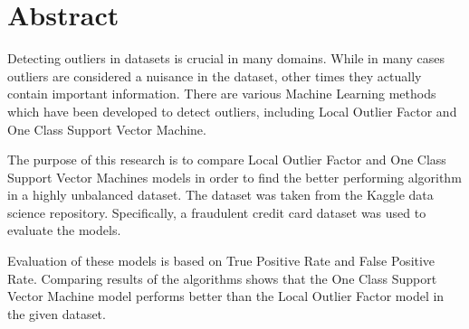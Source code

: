 \chapter*{Abstract}
Detecting outliers in datasets is crucial in many domains. While in many cases outliers are considered a nuisance in the dataset, other times they actually contain important information. There are various Machine Learning methods which have been developed to detect outliers, including Local Outlier Factor and One Class Support Vector Machine.

The purpose of this research is to compare Local Outlier Factor and One Class Support Vector Machines models in order to find the better performing algorithm in a highly unbalanced dataset. The dataset was taken from the Kaggle data science repository. Specifically, a fraudulent credit card dataset was used to evaluate the models.

Evaluation of these models is based on True Positive Rate and False Positive Rate. Comparing results of the algorithms shows that the One Class Support Vector Machine model performs better than the Local Outlier Factor model in the given dataset.
\begin{comment}
Detecting outliers in datasets is valuable in many domains. Identifying the unusual behavior in datasets provide information that is useful. There are various statistical methods used to detect outliers. However, they assume that the data has univariate distribution, which is not generally the case.
There are also various Machine Learning methods which have been developed to detect outliers. Two of the best performing methods are Local Outlier Factor and One Class Support Vector Machine. The Local Outlier Factor model identifies the outliers using \textit{density} of the observation, unlike the One Class Support Vector Machines model which uses the \textit{distance} between observations to find the outliers.

The purpose of this research is to compare Local Outlier Factor and One Class Support Vector Machines models in order to find the better performing algorithm in a highly unbalanced dataset. The dataset was taken from the Kaggle data science repository. Specifically, a fraudulent credit card dataset was used to evaluate the models. The focus of this research will be on these models of semi-supervised techniques, which assume that some of the datasets must be labeled as normal observations.

Evaluation of these models is based on True Positive Rate and False Positive Rate. These rates depend on the model's parameters, thus the experiment has used a range of values for them. Optimal parameters were then chosen to compare the results. Comparing results of the algorithms shows that the One Class Support Vector Machines model performs better than the Local Outlier Factor model in the given dataset.
\end{comment}



